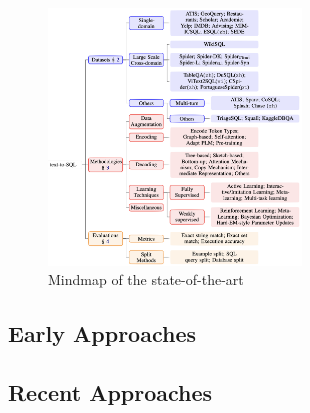 \begin{figure}[htb]
    \centering
    \includegraphics[width=0.6\textwidth]{pics/mindmap.png}
    \caption{Mindmap of the state-of-the-art}
    \label{fig:mindmap}
\end{figure}

\subsection{Early Approaches}

\subsection{Recent Approaches}
